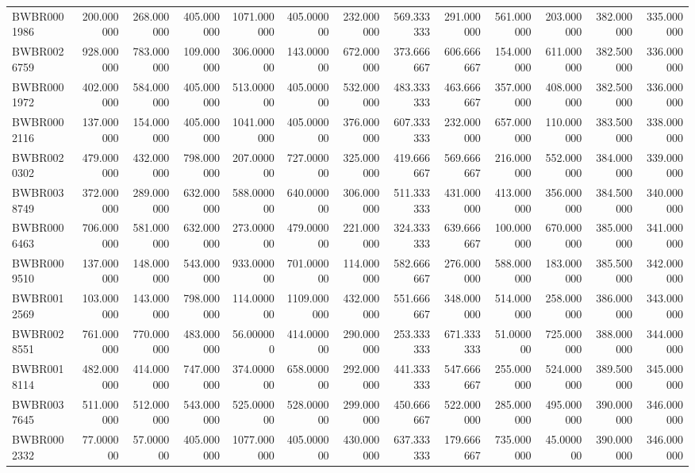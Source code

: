 \begin{longtable}{lrrrrrrrrrrrr}
BWBR0001986 & 200.000000 & 268.000000 & 405.000000 & 1071.000000 & 405.000000 & 232.000000 & 569.333333 & 291.000000 & 561.000000 & 203.000000 & 382.000000 & 335.000000 \\
BWBR0026759 & 928.000000 & 783.000000 & 109.000000 & 306.000000 & 143.000000 & 672.000000 & 373.666667 & 606.666667 & 154.000000 & 611.000000 & 382.500000 & 336.000000 \\
BWBR0001972 & 402.000000 & 584.000000 & 405.000000 & 513.000000 & 405.000000 & 532.000000 & 483.333333 & 463.666667 & 357.000000 & 408.000000 & 382.500000 & 336.000000 \\
BWBR0002116 & 137.000000 & 154.000000 & 405.000000 & 1041.000000 & 405.000000 & 376.000000 & 607.333333 & 232.000000 & 657.000000 & 110.000000 & 383.500000 & 338.000000 \\
BWBR0020302 & 479.000000 & 432.000000 & 798.000000 & 207.000000 & 727.000000 & 325.000000 & 419.666667 & 569.666667 & 216.000000 & 552.000000 & 384.000000 & 339.000000 \\
BWBR0038749 & 372.000000 & 289.000000 & 632.000000 & 588.000000 & 640.000000 & 306.000000 & 511.333333 & 431.000000 & 413.000000 & 356.000000 & 384.500000 & 340.000000 \\
BWBR0006463 & 706.000000 & 581.000000 & 632.000000 & 273.000000 & 479.000000 & 221.000000 & 324.333333 & 639.666667 & 100.000000 & 670.000000 & 385.000000 & 341.000000 \\
BWBR0009510 & 137.000000 & 148.000000 & 543.000000 & 933.000000 & 701.000000 & 114.000000 & 582.666667 & 276.000000 & 588.000000 & 183.000000 & 385.500000 & 342.000000 \\
BWBR0012569 & 103.000000 & 143.000000 & 798.000000 & 114.000000 & 1109.000000 & 432.000000 & 551.666667 & 348.000000 & 514.000000 & 258.000000 & 386.000000 & 343.000000 \\
BWBR0028551 & 761.000000 & 770.000000 & 483.000000 & 56.000000 & 414.000000 & 290.000000 & 253.333333 & 671.333333 & 51.000000 & 725.000000 & 388.000000 & 344.000000 \\
BWBR0018114 & 482.000000 & 414.000000 & 747.000000 & 374.000000 & 658.000000 & 292.000000 & 441.333333 & 547.666667 & 255.000000 & 524.000000 & 389.500000 & 345.000000 \\
BWBR0037645 & 511.000000 & 512.000000 & 543.000000 & 525.000000 & 528.000000 & 299.000000 & 450.666667 & 522.000000 & 285.000000 & 495.000000 & 390.000000 & 346.000000 \\
BWBR0002332 & 77.000000 & 57.000000 & 405.000000 & 1077.000000 & 405.000000 & 430.000000 & 637.333333 & 179.666667 & 735.000000 & 45.000000 & 390.000000 & 346.000000 \\

\end{longtable}
